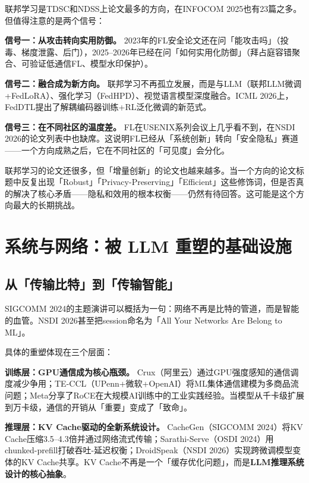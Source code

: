 \documentclass[12pt,a4paper]{ctexart}
\begin{document}
联邦学习是TDSC和NDSS上论文最多的方向，在INFOCOM 2025也有23篇之多。但值得注意的是两个信号：

\textbf{信号一：从攻击转向实用防御。} 2023年的FL安全论文还在问「能攻击吗」（投毒、梯度泄露、后门），2025--2026年已经在问「如何实用化防御」（拜占庭容错聚合、可验证低通信FL、模型水印保护）。

\textbf{信号二：融合成为新方向。} 联邦学习不再孤立发展，而是与LLM（联邦LLM微调+FedLoRA）、强化学习（FedHPD）、视觉语言模型深度融合。ICML 2026上，FedDTL提出了解耦编码器训练+RL泛化微调的新范式。

\textbf{信号三：在不同社区的温度差。} FL在USENIX系列会议上几乎看不到，在NSDI 2026的论文列表中也缺席。这说明FL已经从「系统创新」转向「安全隐私」赛道——一个方向成熟之后，它在不同社区的「可见度」会分化。

\begin{thinkbox}
联邦学习的论文还很多，但「增量创新」的论文也越来越多。当一个方向的论文标题中反复出现「Robust」「Privacy-Preserving」「Efficient」这些修饰词，但是否真的解决了核心矛盾——隐私和效用的根本权衡——仍然有待回答。这可能是这个方向最大的长期挑战。
\end{thinkbox}

\section{系统与网络：被 LLM 重塑的基础设施}

\subsection{从「传输比特」到「传输智能」}

SIGCOMM 2024的主题演讲可以概括为一句：网络不再是比特的管道，而是智能的血管。NSDI 2026甚至把session命名为「All Your Networks Are Belong to ML」。

具体的重塑体现在三个层面：

\textbf{训练层：GPU通信成为核心瓶颈。} Crux（阿里云）通过GPU强度感知的通信调度减少争用；TE-CCL（UPenn+微软+OpenAI）将ML集体通信建模为多商品流问题；Meta分享了RoCE在大规模AI训练中的工业实践经验。当模型从千卡级扩展到万卡级，通信的开销从「重要」变成了「致命」。

\textbf{推理层：KV Cache驱动的全新系统设计。} CacheGen（SIGCOMM 2024）将KV Cache压缩3.5--4.3倍并通过网络流式传输；Sarathi-Serve（OSDI 2024）用chunked-prefill打破吞吐-延迟权衡；DroidSpeak（NSDI 2026）实现跨微调模型变体的KV Cache共享。KV Cache不再是一个「缓存优化问题」，而是\textbf{LLM推理系统设计的核心抽象}。
\end{document}
